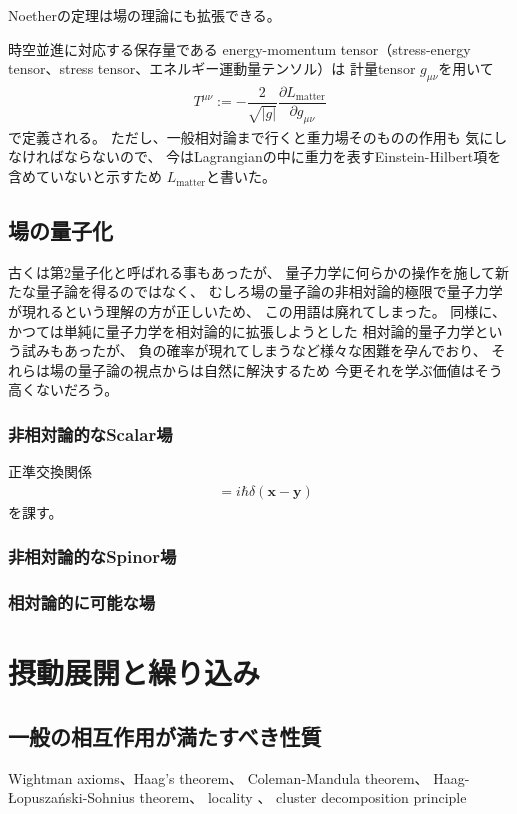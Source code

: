 Noetherの定理は場の理論にも拡張できる。

時空並進に対応する保存量である
energy-momentum tensor（stress-energy tensor、stress tensor、エネルギー運動量テンソル）は
計量tensor $g_{\mu\nu}$を用いて
\begin{align}
    T^{\mu\nu}
    :=
    -
    \dfrac{2}{\sqrt{|g|} }
    \dfrac{\partial L_{\mathrm{matter}}}{\partial g_{\mu\nu}}
\label{energy-momentum}
\end{align}
で定義される。
ただし、一般相対論まで行くと重力場そのものの作用も
気にしなければならないので、
今はLagrangianの中に重力を表すEinstein-Hilbert項を含めていないと示すため
$L_{\mathrm{matter}}$と書いた。

\subsection{場の量子化}

古くは第2量子化と呼ばれる事もあったが、
量子力学に何らかの操作を施して新たな量子論を得るのではなく、
むしろ場の量子論の非相対論的極限で量子力学が現れるという理解の方が正しいため、
この用語は廃れてしまった。
同様に、かつては単純に量子力学を相対論的に拡張しようとした
相対論的量子力学という試みもあったが、
負の確率が現れてしまうなど様々な困難を孕んでおり、
それらは場の量子論の視点からは自然に解決するため
今更それを学ぶ価値はそう高くないだろう。

\subsubsection{非相対論的なScalar場}

正準交換関係
\begin{align}
    [\hat{\phi}(\bm{x}), \hat{\pi}(\bm{y})]
    &=
    i \hbar \delta(\bm{x} - \bm{y})
\end{align}
を課す。

\subsubsection{非相対論的なSpinor場}

\subsubsection{相対論的に可能な場}
\label{representation of Lorentz group}

\section{摂動展開と繰り込み}

\subsection{一般の相互作用が満たすべき性質}
Wightman axioms、Haag's theorem、
Coleman-Mandula theorem、
Haag-\L{}opusza\'nski-Sohnius theorem、
locality
\label{locality}
、
cluster decomposition principle